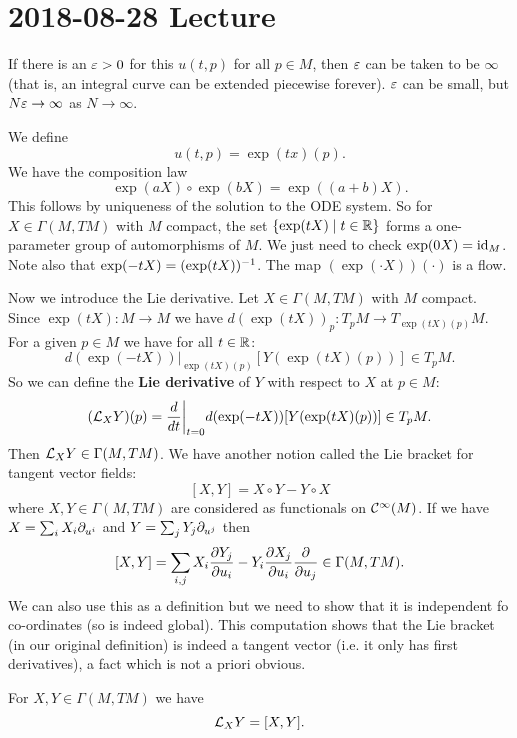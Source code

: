 \section{2018-08-28 Lecture}

\begin{rmk}
  If there is an $\varepsilon>0$ for this $u(t,p)$ for all $p \in M$, then $\varepsilon$ can be taken to be $\infty$ (that is, an integral curve can be extended piecewise forever).
  $\varepsilon$ can be small, but $N\varepsilon\to\infty$ as $N\to\infty$.
\end{rmk}

We define
\[ u(t,p) = \exp(tx)(p). \]
We have the composition law
\[ \exp(aX) \circ \exp(bX) = \exp( (a+b)X ). \]
This follows by uniqueness of the solution to the ODE system.
So for $X\in\Gamma(M,TM)$ with $M$ compact, the set $\{ \exp(tX) \mid t \in \mathbb{R} \}$ forms a one-parameter group of automorphisms of $M$.
We just need to check $\exp(0X)=\operatorname{id}_M$.
Note also that $\exp(-tX)=(\exp(tX))^{-1}$.
The map $(\exp(\cdot X))(\cdot)$ is a flow.

Now we introduce the Lie derivative.
Let $X\in\Gamma(M,TM)$ with $M$ compact.
Since $\exp(tX): M \to M$ we have $d(\exp(tX))_p: T_pM \to T_{\exp(tX)(p)}M$.
For a given $p \in M$ we have for all $t \in \mathbb{R}$:
\[ d(\exp(-tX))|_{\exp(tX)(p)}[Y(\exp(tX)(p))] \in T_pM. \]
So we can define the \textbf{Lie derivative} of $Y$ with respect to $X$ at $p \in M$:
\[ (\mathcal{L}_XY)(p) = \frac{d}{dt}\bigg\vert_{t=0}d(\exp(-tX))[Y(\exp(tX)(p))] \in T_pM. \]
Then $\mathcal{L}_XY \in \Gamma(M,TM)$.
We have another notion called the Lie bracket for tangent vector fields:
\[ [X,Y] = X \circ Y - Y \circ X \]
where $X,Y\in\Gamma(M,TM)$ are considered as functionals on $\mathcal{C}^\infty(M)$.
If we have $X=\sum_iX_i\partial_{u^i}$ and $Y=\sum_jY_j\partial_{u^j}$ then
\[ [X,Y] = \sum_{i,j} X_i \frac{\partial Y_j}{\partial u_i} - Y_i \frac{\partial X_j}{\partial u_i} \frac{\partial}{\partial u_j} \in \Gamma(M,TM). \]
We can also use this as a definition but we need to show that it is independent fo co-ordinates (so is indeed global).
This computation shows that the Lie bracket (in our original definition) is indeed a tangent vector (i.e. it only has first derivatives), a fact which is not a priori obvious.

\begin{prop}[2.19]
  For $X,Y\in\Gamma(M,TM)$ we have
  \[ \mathcal{L}_XY=[X,Y]. \]
\end{prop}

